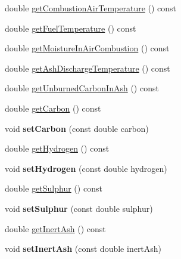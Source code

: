 \begin{DoxyCompactItemize}
\item 
double \hyperlink{class_solid_liquid_flue_gas_material_a8757b831e5a2ef26dbb0cf271c0e8207}{get\+Combustion\+Air\+Temperature} () const
\item 
double \hyperlink{class_solid_liquid_flue_gas_material_a629ecc7104b6bfbb696d9478c4b48e7a}{get\+Fuel\+Temperature} () const
\item 
double \hyperlink{class_solid_liquid_flue_gas_material_ae3d9780851b8217ed2885753f11ec18b}{get\+Moisture\+In\+Air\+Combustion} () const
\item 
double \hyperlink{class_solid_liquid_flue_gas_material_ab233d4e27397cc74fbe2d3084e4e6f7c}{get\+Ash\+Discharge\+Temperature} () const
\item 
double \hyperlink{class_solid_liquid_flue_gas_material_a53ac34a949168a35297ab3afb9eb2c7b}{get\+Unburned\+Carbon\+In\+Ash} () const
\item 
double \hyperlink{class_solid_liquid_flue_gas_material_a7b8a98111943d30094e2d6950f7f2ec1}{get\+Carbon} () const
\item 
\mbox{\label{class_solid_liquid_flue_gas_material_ab89eddf949fefcc1ade049233c2dc12b}} 
void {\bfseries set\+Carbon} (const double carbon)
\item 
double \hyperlink{class_solid_liquid_flue_gas_material_a26af2edd53c50b071648d03bc6442fb6}{get\+Hydrogen} () const
\item 
\mbox{\label{class_solid_liquid_flue_gas_material_a44788e445519bb719a8ff9ca04702e21}} 
void {\bfseries set\+Hydrogen} (const double hydrogen)
\item 
double \hyperlink{class_solid_liquid_flue_gas_material_abe35d8ff283bfa5aadcf00f9906025ae}{get\+Sulphur} () const
\item 
\mbox{\label{class_solid_liquid_flue_gas_material_a34e4eaeb424bcf02dc29a5ab98172ef5}} 
void {\bfseries set\+Sulphur} (const double sulphur)
\item 
double \hyperlink{class_solid_liquid_flue_gas_material_a0549b32b7b5423267d5f59cc96b98127}{get\+Inert\+Ash} () const
\item 
\mbox{\label{class_solid_liquid_flue_gas_material_a75a066ed50d810d5699fd53cb4376dc8}} 
void {\bfseries set\+Inert\+Ash} (const double inert\+Ash)

\end{DoxyCompactItemize}
